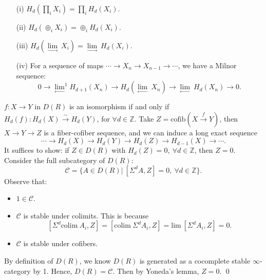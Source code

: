 \documentclass[UTF8,12,a4paper]{ctexart}
\theoremstyle{definition}
\begin{document}
\lem 
\begin{itemize}
    \item [(i)]	$H_d(\prod_i X_i)=\prod_i H_d(X_i).$
	\item [(ii)] $H_d(\oplus_i X_i)=\oplus_i H_d(X_i).$	
	\item [(iii)] $H_d(\underset{\longrightarrow}{\lim}\ X_i)=\underset{\longrightarrow}{\lim}\ H_d(X_i).$	
	\item [(iv)] For a sequence of maps $\cdots\rightarrow X_n\rightarrow X_{n-1}\rightarrow\cdots$, we have a Milnor sequence:
	$$
	0\longrightarrow \underset{\longleftarrow}{\lim}^1 H_{d+1}(X_n)\longrightarrow H_d(\underset{\longleftarrow}{\lim}\ X_n)\longrightarrow \underset{\longleftarrow}{\lim}\ H_d(X_n)\longrightarrow 0.
	$$
\end{itemize}

\prop 
$f:X\rightarrow Y$ in $D(R)$ is an isomorphism if and only if $H_d(f):H_d(X)\stackrel{\sim}{\rightarrow} H_d(Y)$, for $\forall d\in\mathbb{Z}.$
\pf 
Take $Z=\text{cofib}(X\stackrel{f}{\rightarrow}Y)$, then $X\rightarrow Y\rightarrow Z$ is a fiber-cofiber sequence, and we can induce a long exact sequence
$$
\cdots\rightarrow H_d(X)\rightarrow H_d(Y)\rightarrow H_d(Z)\rightarrow H_{d-1}(X)\rightarrow\cdots.
$$
It suffices to show: if $Z\in D(R)$ with $H_d(Z)=0,\ \forall d\in\mathbb{Z}$, then $Z=0.$\\
Consider the full subcategory of $D(R)$:
$$
\mathcal{C}=\{A\in D(R)|\ [\Sigma^d A,Z]=0,\ \forall d\in\mathbb{Z}\}.
$$
Observe that:
\begin{itemize}
	\item $1\in\mathcal{C}$.
	\item $\mathcal{C}$ is stable under colimits. This is because
	$$[\Sigma^d \text{colim}\ A_i,Z]=[\text{colim}\ \Sigma^d A_i,Z]=\text{lim}\ [\Sigma^d A_i,Z]=0.$$
	\item $\mathcal{C}$ is stable under cofibers.
\end{itemize}
By definition of $D(R)$, we know $D(R)$ is generated as a cocomplete stable $\infty$-category by 1. Hence, $D(R)=\mathcal{C}$. Then by Yoneda's lemma, $Z=0.$
\qed
\end{document}
